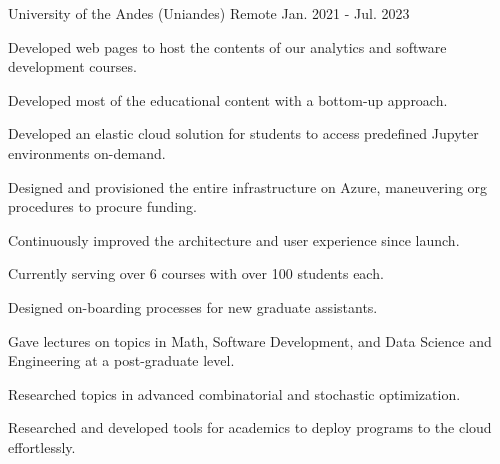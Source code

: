 

\begin{cventries}

	{University of the Andes (Uniandes)} %
	{Remote} %
	{Jan. 2021 {-} Jul. 2023} %
	{
		\begin{cvitems} %
			\item {Developed web pages to host the contents of our analytics and software development courses.}
			\item {Developed most of the educational content with a bottom-up approach.}
			\item {Developed an elastic cloud solution for students to access predefined Jupyter environments on-demand.}
			\item {Designed and provisioned the entire infrastructure on Azure, maneuvering org procedures to procure funding.}
			\item {Continuously improved the architecture and user experience since launch.}
			\item {Currently serving over 6 courses with over 100 students each.}
			\item {Designed on-boarding processes for new graduate assistants.}
			\item {Gave lectures on topics in Math, Software Development, and Data Science and Engineering at a post-graduate level.}
			\item {Researched topics in advanced combinatorial and stochastic optimization.}
			\item {Researched and developed tools for academics to deploy programs to the cloud effortlessly.}
		\end{cvitems}
	}


\end{cventries}
